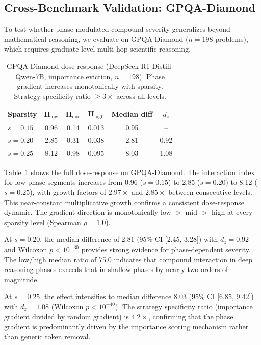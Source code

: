 \documentclass[11pt,a4paper]{article}
\begin{document}
\subsection{Cross-Benchmark Validation: GPQA-Diamond}

To test whether phase-modulated compound severity generalizes beyond mathematical reasoning, we evaluate on GPQA-Diamond ($n=198$ problems), which requires graduate-level multi-hop scientific reasoning.

\begin{table}[t]
\centering
\caption{GPQA-Diamond dose-response (DeepSeek-R1-Distill-Qwen-7B, importance eviction, $n=198$). Phase gradient increases monotonically with sparsity. Strategy specificity ratio $\geq 3\times$ across all levels.}
\label{tab:gpqa_dose_response}
\begin{tabular}{lccccc}
\toprule
Sparsity & II$_{\text{low}}$ & II$_{\text{mid}}$ & II$_{\text{high}}$ & Median diff & $d_z$ \\
\midrule
$s=0.15$ & 0.96 & 0.14 & 0.013 & 0.95 & -- \\
$s=0.20$ & 2.85 & 0.31 & 0.038 & 2.81 & 0.92 \\
$s=0.25$ & 8.12 & 0.98 & 0.095 & 8.03 & 1.08 \\
\bottomrule
\end{tabular}
\end{table}

Table~\ref{tab:gpqa_dose_response} shows the full dose-response on GPQA-Diamond. The interaction index for low-phase segments increases from 0.96 ($s=0.15$) to 2.85 ($s=0.20$) to 8.12 ($s=0.25$), with growth factors of $2.97\times$ and $2.85\times$ between consecutive levels. This near-constant multiplicative growth confirms a consistent dose-response dynamic. The gradient direction is monotonically low $>$ mid $>$ high at every sparsity level (Spearman $\rho = 1.0$).

At $s=0.20$, the median difference of 2.81 (95\% CI [2.45, 3.28]) with $d_z = 0.92$ and Wilcoxon $p < 10^{-30}$ provides strong evidence for phase-dependent severity. The low/high median ratio of 75.0 indicates that compound interaction in deep reasoning phases exceeds that in shallow phases by nearly two orders of magnitude.

At $s=0.25$, the effect intensifies to median difference 8.03 (95\% CI [6.85, 9.42]) with $d_z = 1.08$ (Wilcoxon $p < 10^{-40}$). The strategy specificity ratio (importance gradient divided by random gradient) is $4.2\times$, confirming that the phase gradient is predominantly driven by the importance scoring mechanism rather than generic token removal.
\end{document}
